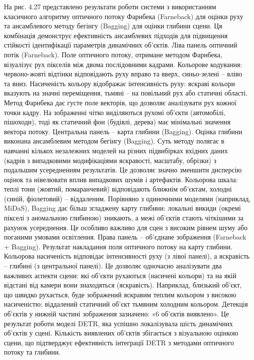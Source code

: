 \documentclass[
]{article}
\begin{document}
На рис. 4.27 представлено результати роботи системи з використанням класичного алгоритму оптичного потоку Фарнбека (Farneback) для оцінки руху та ансамблевого методу бегінгу (Bagging) для оцінки глибини сцени. Ця комбінація демонструє ефективність ансамблевих підходів для підвищення стійкості ідентифікації параметрів динамічних об'єктів. Ліва панель оптичний потік (Farneback). Поле оптичного потоку, отримане методом Фарнбека, візуалізує рух пікселів між двома послідовними кадрами. Кольорове кодування: червоно-жовті відтінки відповідають руху вправо та вверх, синьо-зелені -- вліво та вниз. Насиченість кольору відображає інтенсивність руху: яскраві кольори вказують на значні переміщення, тьмяні -- на повільний рух або статичні області. Метод Фарнбека дає густе поле векторів, що дозволяє аналізувати рух кожної точки кадру. На зображенні чітко виділяються рухомі об'єкти (автомобілі, пішоходи), тоді як статичний фон (будівлі, дерева) має мінімальні значення вектора потоку. Центральна панель -- карта глибини (Bagging). Оцінка глибини виконана ансамблевим методом бегінгу (Bagging). Суть методу полягає в навчанні кількох незалежних моделей на різних підвибірках вхідних даних (кадрів з випадковими модифікаціями яскравості, масштабу, обрізки) з подальшим усередненням результатів. Це дозволяє значно зменшити дисперсію оцінок та нівелювати вплив випадкових шумів і артефактів. Кольорова шкала: теплі тони (жовтий, помаранчевий) відповідають ближнім об'єктам, холодні (синій, фіолетовий) -- віддаленим. Порівняно з одиночними моделями (наприклад, MiDaS), Bagging дає більш згладжену карту глибини: локальні викиди (окремі пікселі з аномальною глибиною) зникають, а межі об'єктів стають чіткішими за рахунок усереднення. Це особливо важливо для сцен з високим рівнем шуму або поганими умовами освітлення. Права панель -- об'єднане зображення (Farneback + Bagging). Результат накладання поля оптичного потоку на карту глибини. Кольорова насиченість відповідає інтенсивності руху (з лівої панелі), а яскравість -- глибині (з центральної панелі). Це дозволяє одночасно аналізувати два важливих аспекти сцени: які об'єкти рухаються (насичені кольори) та на якій відстані від камери вони знаходяться (яскравість). Наприклад, близький об'єкт, що швидко рухається, буде зображений яскравим теплим кольором з високою насиченістю; віддалений статичний об'єкт тьмяним холодним кольором. Детекція об'єктів у нижній частині зображення зазначено: «6 об'єктів виявлено». Це результат роботи моделі DETR, яка успішно локалізувала шість динамічних об'єктів у сцені. Кількість виявлених об'єктів збігається з візуальною оцінкою сцени, що підтверджує ефективність інтеграції DETR з методами оптичного потоку та глибини.
\end{document}
